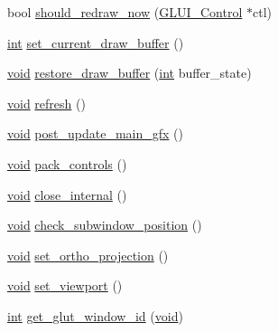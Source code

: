 \begin{DoxyCompactItemize}
\item 
bool \hyperlink{class_g_l_u_i___main_a838a093d3748a6a6434f5e3a62d29c79}{should\+\_\+redraw\+\_\+now} (\hyperlink{class_g_l_u_i___control}{G\+L\+U\+I\+\_\+\+Control} $\ast$ctl)
\item 
\hyperlink{wglext_8h_a500a82aecba06f4550f6849b8099ca21}{int} \hyperlink{class_g_l_u_i___main_a022e4708ab5f105fb49202b7dd28e7b4}{set\+\_\+current\+\_\+draw\+\_\+buffer} ()
\item 
\hyperlink{wglext_8h_a9e6b7f1933461ef318bb000d6bd13b83}{void} \hyperlink{class_g_l_u_i___main_a56523ef45aea9c350009c6d91a67a028}{restore\+\_\+draw\+\_\+buffer} (\hyperlink{wglext_8h_a500a82aecba06f4550f6849b8099ca21}{int} buffer\+\_\+state)
\item 
\hyperlink{wglext_8h_a9e6b7f1933461ef318bb000d6bd13b83}{void} \hyperlink{class_g_l_u_i___main_acd1e25e989f0f1820c496d4b8b9ee422}{refresh} ()
\item 
\hyperlink{wglext_8h_a9e6b7f1933461ef318bb000d6bd13b83}{void} \hyperlink{class_g_l_u_i___main_a64302740a0fb9ca34de276d001fbd8bd}{post\+\_\+update\+\_\+main\+\_\+gfx} ()
\item 
\hyperlink{wglext_8h_a9e6b7f1933461ef318bb000d6bd13b83}{void} \hyperlink{class_g_l_u_i___main_aa3c49dcfbc912870344e9265354ad53a}{pack\+\_\+controls} ()
\item 
\hyperlink{wglext_8h_a9e6b7f1933461ef318bb000d6bd13b83}{void} \hyperlink{class_g_l_u_i___main_a3a6613342a97448cad9677d291165889}{close\+\_\+internal} ()
\item 
\hyperlink{wglext_8h_a9e6b7f1933461ef318bb000d6bd13b83}{void} \hyperlink{class_g_l_u_i___main_a8ca1f714c14dade8e6274112c69e5863}{check\+\_\+subwindow\+\_\+position} ()
\item 
\hyperlink{wglext_8h_a9e6b7f1933461ef318bb000d6bd13b83}{void} \hyperlink{class_g_l_u_i___main_a3216ab4a380f2a904e152524f4687e29}{set\+\_\+ortho\+\_\+projection} ()
\item 
\hyperlink{wglext_8h_a9e6b7f1933461ef318bb000d6bd13b83}{void} \hyperlink{class_g_l_u_i___main_a444621e91c377d33121f8bc95ed80d98}{set\+\_\+viewport} ()
\item 
\hyperlink{wglext_8h_a500a82aecba06f4550f6849b8099ca21}{int} \hyperlink{class_g_l_u_i___main_a8187156aa77f0f9b34660addf333ca79}{get\+\_\+glut\+\_\+window\+\_\+id} (\hyperlink{wglext_8h_a9e6b7f1933461ef318bb000d6bd13b83}{void})
\end{DoxyCompactItemize}
